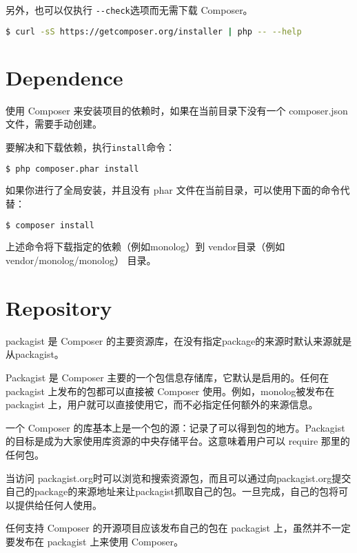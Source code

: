 另外，也可以仅执行 \texttt{-\/-check}选项而无需下载 Composer。 

\begin{lstlisting}[language=bash]
$ curl -sS https://getcomposer.org/installer | php -- --help
\end{lstlisting}

\section{Dependence}

使用 Composer 来安装项目的依赖时，如果在当前目录下没有一个 composer.json 文件，需要手动创建。

要解决和下载依赖，执行\texttt{install}命令：


\begin{lstlisting}[language=bash]
$ php composer.phar install
\end{lstlisting}


如果你进行了全局安装，并且没有 phar 文件在当前目录，可以使用下面的命令代替：

\begin{lstlisting}[language=bash]
$ composer install
\end{lstlisting}

上述命令将下载指定的依赖（例如monolog）到 vendor目录（例如vendor/monolog/monolog） 目录。




\section{Repository}

packagist 是 Composer 的主要资源库，在没有指定package的来源时默认来源就是从packagist。

Packagist 是 Composer 主要的一个包信息存储库，它默认是启用的。任何在 packagist 上发布的包都可以直接被 Composer 使用。例如，monolog被发布在 packagist 上，用户就可以直接使用它，而不必指定任何额外的来源信息。

一个 Composer 的库基本上是一个包的源：记录了可以得到包的地方。Packagist 的目标是成为大家使用库资源的中央存储平台。这意味着用户可以 require 那里的任何包。

当访问 packagist.org时可以浏览和搜索资源包，而且可以通过向packagist.org提交自己的package的来源地址来让packagist抓取自己的包。一旦完成，自己的包将可以提供给任何人使用。

任何支持 Composer 的开源项目应该发布自己的包在 packagist 上，虽然并不一定要发布在 packagist 上来使用 Composer。


